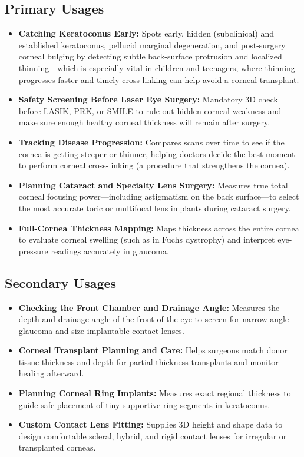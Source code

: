 \subsection{Primary Usages}
\begin{itemize}
    \item \textbf{Catching Keratoconus Early:} Spots early, hidden (subclinical) and established keratoconus, pellucid marginal degeneration, and post-surgery corneal bulging by detecting subtle back-surface protrusion and localized thinning---which is especially vital in children and teenagers, where thinning progresses faster and timely cross-linking can help avoid a corneal transplant.
    \item \textbf{Safety Screening Before Laser Eye Surgery:} Mandatory 3D check before LASIK, PRK, or SMILE to rule out hidden corneal weakness and make sure enough healthy corneal thickness will remain after surgery.
    \item \textbf{Tracking Disease Progression:} Compares scans over time to see if the cornea is getting steeper or thinner, helping doctors decide the best moment to perform corneal cross-linking (a procedure that strengthens the cornea).
    \item \textbf{Planning Cataract and Specialty Lens Surgery:} Measures true total corneal focusing power---including astigmatism on the back surface---to select the most accurate toric or multifocal lens implants during cataract surgery.
    \item \textbf{Full-Cornea Thickness Mapping:} Maps thickness across the entire cornea to evaluate corneal swelling (such as in Fuchs dystrophy) and interpret eye-pressure readings accurately in glaucoma.
\end{itemize}

\subsection{Secondary Usages}
\begin{itemize}
    \item \textbf{Checking the Front Chamber and Drainage Angle:} Measures the depth and drainage angle of the front of the eye to screen for narrow-angle glaucoma and size implantable contact lenses.
    \item \textbf{Corneal Transplant Planning and Care:} Helps surgeons match donor tissue thickness and depth for partial-thickness transplants and monitor healing afterward.
    \item \textbf{Planning Corneal Ring Implants:} Measures exact regional thickness to guide safe placement of tiny supportive ring segments in keratoconus.
    \item \textbf{Custom Contact Lens Fitting:} Supplies 3D height and shape data to design comfortable scleral, hybrid, and rigid contact lenses for irregular or transplanted corneas.
\end{itemize}

